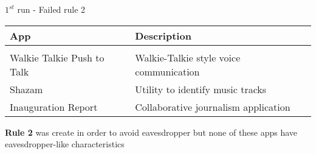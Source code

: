 \begin{frame}{$1^{st}$ run - Failed rule 2}

\fontsize{10pt}{0}\selectfont
\begin{table}[]
\centering
\begin{tabular}{ll}
\textbf{App}              & \textbf{Description}                    \\[5pt] 
\hline\\[5pt]
Walkie Talkie Push to Talk & Walkie-Talkie style voice communication \\[5pt]
Shazam                    & Utility to identify music tracks        \\[5pt]
Inauguration Report       & Collaborative journalism application    \\[5pt]
\hline
\end{tabular}
\end{table}
\fontsize{15pt}{0}\selectfont

\vfill

\textbf{Rule 2} was create in order to avoid eavesdropper but none of these apps
have eavesdropper-like characteristics

\end{frame}
